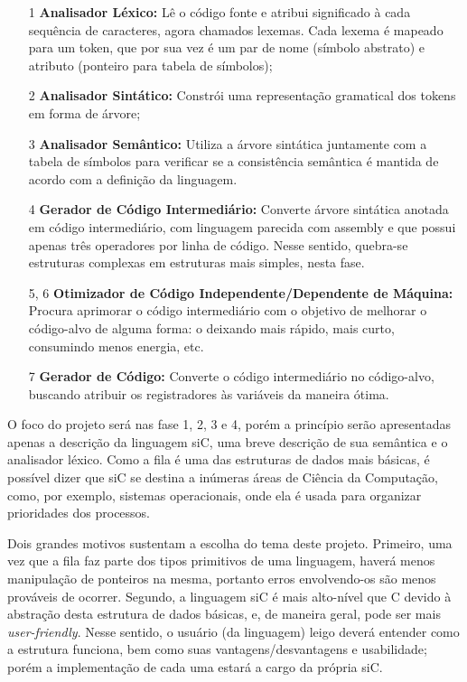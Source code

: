 \documentclass[12pt]{article}
\begin{document}
\begin{itemize}
	\item[1] \textbf{Analisador Léxico:} Lê o código fonte e atribui significado à cada sequência de caracteres, agora chamados lexemas. Cada lexema é mapeado para um token, que por sua vez é um par de nome (símbolo abstrato) e atributo (ponteiro para tabela de símbolos);
	\item[2] \textbf{Analisador Sintático:} Constrói uma representação gramatical dos tokens em forma de árvore;
	\item[3] \textbf{Analisador Semântico:} Utiliza a árvore sintática juntamente com a tabela de símbolos para verificar se a consistência semântica é mantida de acordo com a definição da linguagem.
	\item[4] \textbf{Gerador de Código Intermediário:} Converte árvore sintática anotada em código intermediário, com linguagem parecida com assembly e que possui apenas três operadores por linha de código. Nesse sentido, quebra-se estruturas complexas em estruturas mais simples, nesta fase.
	\item[5, 6] \textbf{Otimizador de Código Independente/Dependente de Máquina:} Procura aprimorar o código intermediário com o objetivo de melhorar o código-alvo de alguma forma: o deixando mais rápido, mais curto, consumindo menos energia, etc.
	\item[7] \textbf{Gerador de Código:} Converte o código intermediário no código-alvo, 	buscando atribuir os registradores às variáveis da maneira ótima.
\end{itemize}

\indent O foco do projeto será nas fase 1, 2, 3 e 4, porém a princípio serão apresentadas apenas a descrição da linguagem siC, uma breve descrição de sua semântica e o analisador léxico. Como a fila é uma das estruturas de dados mais básicas, é possível dizer que siC se destina a inúmeras áreas de Ciência da Computação, como, por exemplo, sistemas operacionais, onde ela é usada para organizar prioridades dos processos.

\indent Dois grandes motivos sustentam a escolha do tema deste projeto. Primeiro, uma vez que a fila faz parte dos tipos primitivos de uma linguagem, haverá menos manipulação de ponteiros na mesma, portanto erros envolvendo-os são menos prováveis de ocorrer. Segundo, a linguagem siC é mais alto-nível que C devido à abstração desta estrutura de dados básicas, e, de maneira geral, pode ser mais \textit{user-friendly}. Nesse sentido, o usuário (da linguagem) leigo deverá entender como a estrutura funciona, bem como suas vantagens/desvantagens e usabilidade; porém a implementação de cada uma estará a cargo da própria siC. 
\end{document}
